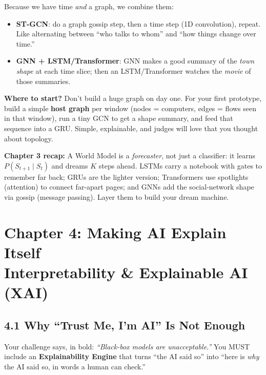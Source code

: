 \documentclass[11pt,a4paper]{article}
\begin{document}
Because we have time \emph{and} a graph, we combine them:
\begin{itemize}[leftmargin=1.6em,itemsep=2pt]
  \item \textbf{ST-GCN}: do a graph gossip step, then a time step (1D
        convolution), repeat. Like alternating between ``who talks to whom''
        and ``how things change over time.''
  \item \textbf{GNN + LSTM/Transformer}: GNN makes a good summary of the
        \emph{town shape} at each time slice; then an LSTM/Transformer watches
the \emph{movie} of those summaries.
\end{itemize}

\begin{tipbox}
\textbf{Where to start?} Don't build a huge graph on day one. For your first
prototype, build a simple \textbf{host graph} per window (nodes = computers,
edges = flows seen in that window), run a tiny GCN to get a shape summary,
and feed that sequence into a GRU. Simple, explainable, and judges will love
that you thought about topology.
\end{tipbox}

\begin{recap}
\textbf{Chapter 3 recap:} A World Model is a \emph{forecaster}, not just a
classifier: it learns $P(S_{t+1}\mid S_t)$ and dreams $K$ steps ahead. LSTMs
carry a notebook with gates to remember far back; GRUs are the lighter version;
Transformers use spotlights (attention) to connect far-apart pages; and GNNs
add the social-network shape via gossip (message passing). Layer them to build
your dream machine.
\end{recap}

\newpage

\section{Chapter 4: Making AI Explain Itself \\
\small Interpretability \& Explainable AI (XAI)}
\label{sec:xai}

\subsection{4.1 Why ``Trust Me, I'm AI'' Is Not Enough}

Your challenge says, in bold: \emph{``Black-box models are unacceptable.''}
You MUST include an \textbf{Explainability Engine} that turns ``the AI said
so'' into ``here is \emph{why} the AI said so, in words a human can check.''
\end{document}
